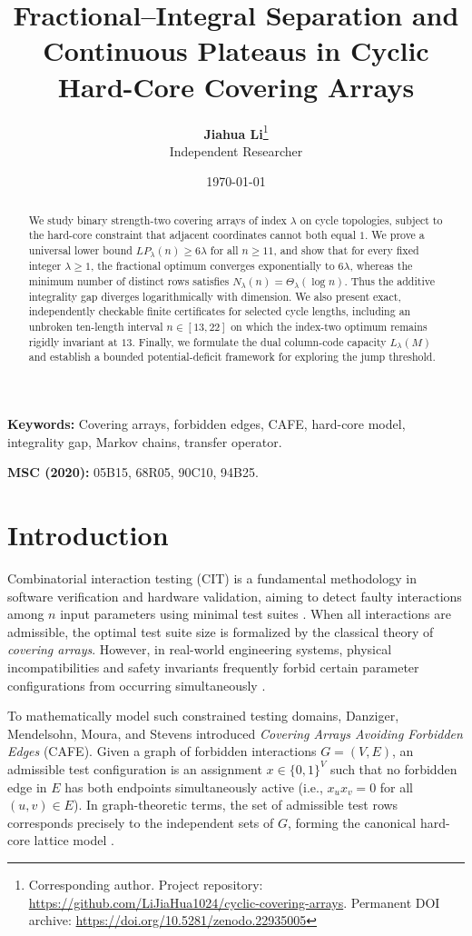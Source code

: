 \documentclass[11pt,a4paper]{article}
\title{\textbf{Fractional--Integral Separation and Continuous Plateaus in Cyclic Hard-Core Covering Arrays}}
\author{
    \textbf{Jiahua Li}\thanks{Corresponding author. Project repository: \url{https://github.com/LiJiaHua1024/cyclic-covering-arrays}. Permanent DOI archive: \url{https://doi.org/10.5281/zenodo.22935005}} \\
    \small Independent Researcher
}
\date{\today}
\theoremstyle{definition}
\theoremstyle{remark}
\begin{document}
\maketitle

\begin{abstract}
We study binary strength-two covering arrays of index $\lambda$ on cycle topologies, subject to the hard-core constraint that adjacent coordinates cannot both equal $1$. We prove a universal lower bound $LP_\lambda(n) \ge 6\lambda$ for all $n \ge 11$, and show that for every fixed integer $\lambda \ge 1$, the fractional optimum converges exponentially to $6\lambda$, whereas the minimum number of distinct rows satisfies $N_\lambda(n) = \Theta_\lambda(\log n)$. Thus the additive integrality gap diverges logarithmically with dimension. We also present exact, independently checkable finite certificates for selected cycle lengths, including an unbroken ten-length interval $n \in [13, 22]$ on which the index-two optimum remains rigidly invariant at $13$. Finally, we formulate the dual column-code capacity $L_\lambda(M)$ and establish a bounded potential-deficit framework for exploring the jump threshold.
\end{abstract}

\noindent\textbf{Keywords:} Covering arrays, forbidden edges, CAFE, hard-core model, integrality gap, Markov chains, transfer operator.

\noindent\textbf{MSC (2020):} 05B15, 68R05, 90C10, 94B25.

\section{Introduction}
\label{sec:intro}

Combinatorial interaction testing (CIT) is a fundamental methodology in software verification and hardware validation, aiming to detect faulty interactions among $n$ input parameters using minimal test suites \cite{colbourn2004combinatorial,hartman2004problems}. When all interactions are admissible, the optimal test suite size is formalized by the classical theory of \emph{covering arrays}. However, in real-world engineering systems, physical incompatibilities and safety invariants frequently forbid certain parameter configurations from occurring simultaneously \cite{cohen2008constructing}.

To mathematically model such constrained testing domains, Danziger, Mendelsohn, Moura, and Stevens \cite{danziger2009covering} introduced \emph{Covering Arrays Avoiding Forbidden Edges} (CAFE). Given a graph of forbidden interactions $G = (V, E)$, an admissible test configuration is an assignment $x \in \{0, 1\}^V$ such that no forbidden edge in $E$ has both endpoints simultaneously active (i.e., $x_u x_v = 0$ for all $(u, v) \in E$). In graph-theoretic terms, the set of admissible test rows corresponds precisely to the independent sets of $G$, forming the canonical hard-core lattice model \cite{brightwell1999hard}.
\end{document}
